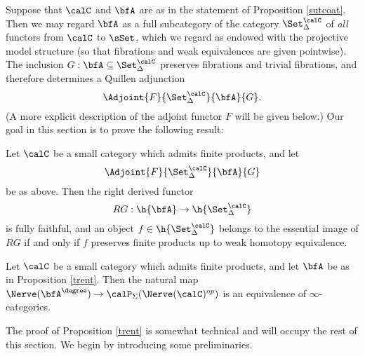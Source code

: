 Suppose that $\calC$ and $\bfA$ are as in the statement of Proposition \ref{sutcoat}. Then we may regard $\bfA$ as a full subcategory of the category $\Set_{\Delta}^{\calC}$ of {\em all} functors
from $\calC$ to $\sSet$, which we regard as endowed with the projective model structure (so that fibrations and weak equivalences are given pointwise). The inclusion $G:\bfA \subseteq \Set_{\Delta}^{\calC}$ preserves fibrations and trivial fibrations, and therefore determines a Quillen adjunction
$$\Adjoint{F}{ \Set_{\Delta}^{\calC}}{\bfA}{G}.$$
(A more explicit description of the adjoint functor $F$ will be given below.) Our goal in this section is to prove the following result:

\begin{proposition}[Bergner]\label{trent}
Let $\calC$ be a small category which admits finite products, and let
$$ \Adjoint{ F }{ \Set_{\Delta}^{\calC} }{ \bfA }{ G}$$
be as above. Then the right derived functor
$$ RG: \h{\bfA} \rightarrow \h{\Set_{\Delta}^{\calC}}$$
is fully faithful, and an object $f \in \h{\Set_{\Delta}^{\calC}}$ belongs to the essential image of $RG$ if and only if $f$ preserves finite products up to weak homotopy equivalence.
\end{proposition}

\begin{corollary}\label{smokerr}
Let $\calC$ be a small category which admits finite products, and let $\bfA$ be as in Proposition \ref{trent}. Then the natural map $\Nerve( \bfA^{\degree} ) \rightarrow \calP_{\Sigma}( \Nerve(\calC)^{op} )$
is an equivalence of $\infty$-categories.
\end{corollary}

The proof of Proposition \ref{trent} is somewhat technical and will occupy the rest of this section. We begin by introducing some preliminaries.

